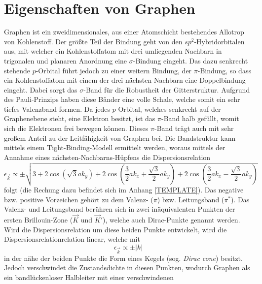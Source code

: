 \section{Eigenschaften von Graphen}
\label{sec:propertiesofgraphene}
Graphen ist ein zweidimensionales, aus einer Atomschicht bestehendes Allotrop von Kohlenstoff. 
Der größte Teil der Bindung geht von den $sp^2$-Hybridorbitalen aus, mit welcher ein Kohlenstoffatom mit drei umliegenden
Nachbarn in trigonalen und planaren Anordnung eine $\sigma$-Bindung eingeht.\cite{RevModPhys.81.109}
Das dazu senkrecht stehende $p$-Orbital führt jedoch zu einer weitern Bindung, der $\pi$-Bindung, so dass ein Kohlenstoffatom
mit einem der drei nächsten Nachbarn eine Doppelbindung eingeht.
Dabei sorgt das $\sigma$-Band für die Robustheit der Gitterstruktur.\cite{RevModPhys.81.109}
Aufgrund des Pauli-Prinzips haben diese Bänder eine volle Schale, welche somit ein sehr tiefes Valenzband
formen.\cite{RevModPhys.81.109}
Da jedes $p$-Orbital, welches senkrecht auf der Graphenebene steht, eine Elektron
besitzt, ist das $\pi$-Band halb gefüllt, womit sich die Elektronen frei bewegen können.\cite{RevModPhys.81.109}\cite{graphene_properties}
Dieses $\pi$-Band trägt auch mit sehr großem Anteil zu der Leitfähigkeit von Graphen bei.\cite{graphene_properties}
Die Bandstruktur kann mittels einem Tight-Binding-Modell ermittelt werden, woraus mittels der Annahme eines nächsten-Nachbarns-Hüpfens
die Dispersionsrelation 
\begin{equation*}
    \epsilon_{\vec{k}} \propto \pm \sqrt{3+2\cos(\sqrt{3}ak_y)+2\cos(\frac{3}{2}ak_x+\frac{\sqrt{3}}{2}ak_y) + 2\cos(\frac{3}{2}ak_x-\frac{\sqrt{3}}{2}ak_y) }
\end{equation*}
folgt (die Rechung dazu befindet sich im Anhang \ref{TEMPLATE}).
Das negative bzw. positive Vorzeichen gehört zu dem Valenz- ($\pi$) bzw. Leitungsband ($\pi^*$).\cite{RevModPhys.81.109}
Das Valenz- und Leitungsband berühren sich in zwei inäquivalenten Punkten der ersten Brillouin-Zone ($\vec{K}$ und $\vec{K}'$), welche 
auch Dirac-Punkte genannt werden.\cite{10.1093/nsr/nwu080}
Wird die Dispersionsrelation um diese beiden Punkte entwickelt, wird die Dispersionsrelationrelation linear, welche mit 
\begin{equation}
    \epsilon_{\vec{k}} \propto \pm | k | 
\end{equation}
in der nähe der beiden Punkte die Form eines Kegels (sog. \textit{Dirac cone}) besitzt.\cite{10.1093/nsr/nwu080}\cite{Avouris2007}
Jedoch verschwindet die Zustandsdichte in diesen Punkten, wodurch Graphen als ein bandlückenloser Halbleiter mit einer verschwindenen 
